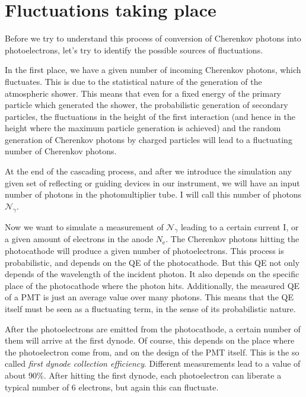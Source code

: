 \documentclass{article}
\def\Cherenkov{Cherenkov\xspace}
\def\QE{\ensuremath{\mathcal{QE}}\xspace}
\def\Nphot{\ensuremath{%
  \mathcal{N}_{\gamma}}\xspace}
\begin{document}
\section{Fluctuations taking place}

Before we try to understand this process of conversion of \Cherenkov
photons into photoelectrons, let's try to identify the possible
sources of fluctuations.

In the first place, we have a given number of incoming \Cherenkov
photons, which fluctuates. This is due to the statistical nature of
the generation of the atmospheric shower. This means that even for a
fixed energy of the primary particle which generated the shower, the
probabilistic generation of secondary particles, the fluctuations in
the height of the first interaction (and hence in the height where the
maximum particle generation is achieved) and the random generation of
\Cherenkov photons by charged particles will lead to a fluctuating
number of Cherenkov photons.

At the end of the cascading process, and after we introduce the
simulation any given set of reflecting or guiding devices in our
instrument, we will have an input number of photons in the
photomultiplier tube. I will call this number of photons \Nphot.

Now we want to simulate a measurement of \Nphot leading to a certain
current I, or a given amount of electrons in the anode
$N_{\mathrm{e}}$. The \Cherenkov photons hitting the photocathode will
produce a given number of photoelectrons. This process is
probabilistic, and depends on the QE of the photocathode. But this QE
not only depends of the wavelength of the incident photon. It also
depends on the specific place of the photocathode where the photon
hits. Additionally, the measured QE of a PMT is just an average value
over many photons. This means that the QE itself must be seen as a
fluctuating term, in the sense of its probabilistic nature.


After the photoelectrons are emitted from the photocathode, a certain
number of them will arrive at the first dynode. Of course, this
depends on the place where the photoelectron come from, and on the
design of the PMT itself. This is the so called \emph{first dynode
collection efficiency}. Different measurements lead to a value of
about 90\%. After hitting the first dynode, each photoelectron can
liberate a typical number of 6 electrons, but again this can
fluctuate. 
\end{document}
